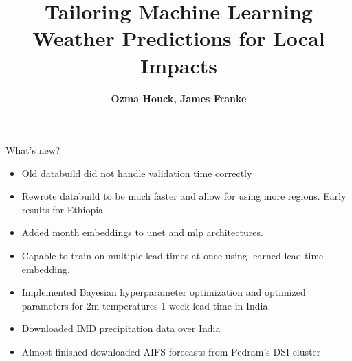 \documentclass[aspectratio=169, xcolor=dvipsnames]{beamer}
\title{Tailoring Machine Learning Weather Predictions for Local Impacts}
\author{\textbf{Ozma Houck, James Franke}}
\date{}
\begin{document}
\maketitle

\begin{frame}{What's new?}
\begin{itemize}
    \item Old databuild did not handle validation time correctly
    \item Rewrote databuild to be much faster and allow for using more regions. Early results for Ethiopia 
    \item Added month embeddings to unet and mlp architectures.
    \item Capable to train on multiple lead times at once using learned lead time embedding.
    \item Implemented Bayesian hyperparameter optimization and optimized parameters for 2m temperatures 1 week lead time in India.
    \item Downloaded IMD precipitation data over India
    \item Almost finished downloaded AIFS forecasts from Pedram's DSI cluster
\end{itemize}
\end{frame}
\end{document}
